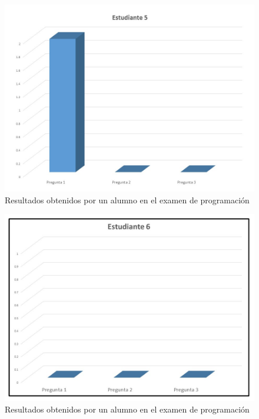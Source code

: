 \documentclass[12pt] {report}
\begin{document}
\begin{figure}[H]
\centering 
\includegraphics[scale=.7]{PEstudiante5.JPG}
\caption{Resultados obtenidos por un alumno en el examen de programación}
\end{figure}

\begin{figure}[H]
\centering 
\includegraphics[scale=.7]{PEstudiante6.JPG}
\caption{Resultados obtenidos por un alumno en el examen de programación}
\end{figure}
\end{document}
